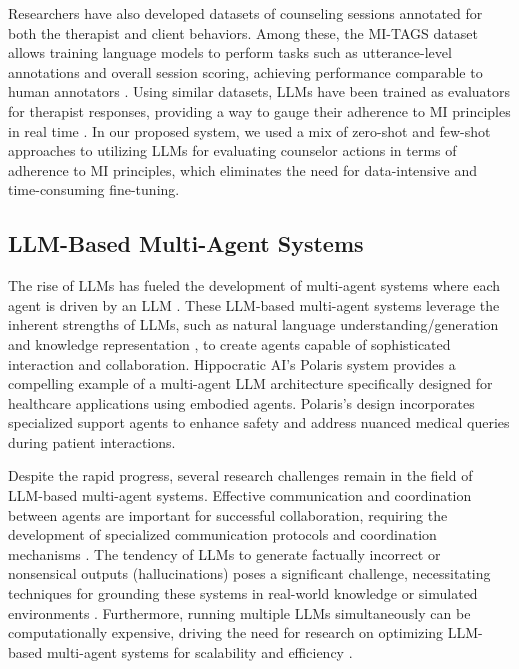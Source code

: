 Researchers have also developed datasets of counseling sessions annotated for both the therapist and client behaviors. Among these, the MI-TAGS dataset allows training language models to perform tasks such as utterance-level annotations and overall session scoring, achieving performance comparable to human annotators \cite{cohen2024motivational}. Using similar datasets, LLMs have been trained as evaluators for therapist responses, providing a way to gauge their adherence to MI principles in real time \cite{wu2023natural, wu2022anno}. In our proposed system, we used a mix of zero-shot and few-shot approaches to utilizing LLMs for evaluating counselor actions in terms of adherence to MI principles, which eliminates the need for data-intensive and time-consuming fine-tuning.

\subsection{LLM-Based Multi-Agent Systems}
The rise of LLMs has fueled the development of multi-agent systems where each agent is driven by an LLM \cite{guo2024large}. These LLM-based multi-agent systems leverage the inherent strengths of LLMs, such as natural language understanding/generation and knowledge representation \cite{pezeshkpour2023measuring}, to create agents capable of sophisticated interaction and collaboration. Hippocratic AI's Polaris system \cite{mukherjee2024polaris} provides a compelling example of a multi-agent LLM architecture specifically designed for healthcare applications using embodied agents. Polaris's design incorporates specialized support agents to enhance safety and address nuanced medical queries during patient interactions. 

Despite the rapid progress, several research challenges remain in the field of LLM-based multi-agent systems. Effective communication and coordination between agents are important for successful collaboration, requiring the development of specialized communication protocols and coordination mechanisms \cite{liu2023dynamic, zhang2023proagent}. The tendency of LLMs to generate factually incorrect or nonsensical outputs (hallucinations) poses a significant challenge, necessitating techniques for grounding these systems in real-world knowledge or simulated environments \cite{huang2023survey}. Furthermore, running multiple LLMs simultaneously can be computationally expensive, driving the need for research on optimizing LLM-based multi-agent systems for scalability and efficiency \cite{chen2023agentverse}.
